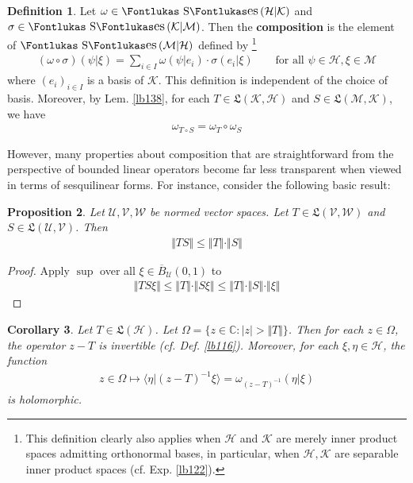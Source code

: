 \documentclass[12pt,b5paper,notitlepage]{article}
\theoremstyle{definition}
\newtheorem{df}{Definition}[subsection]
\theoremstyle{plain}
\newtheorem{pp}[df]{Proposition}
\newtheorem{co}[df]{Corollary}
\DeclareMathOperator{\Ses}{\text{\Fontlukas S}\text{\kern -0pt {\Fontlukas\large es}}\,}
\newcommand{\fk}{\mathfrak}
\newcommand{\ovl}{\overline}
\newcommand{\bk}[1]{\langle {#1}\rangle}
\newcommand{\Cbb}{\mathbb C}
\newcommand{\MU}{\mathcal U}
\newcommand{\MV}{\mathcal V}
\newcommand{\MW}{\mathcal W}
\newcommand{\MH}{\mathcal H}
\newcommand{\MK}{\mathcal K}
\newcommand{\MM}{\mathcal M}
\numberwithin{equation}{section}
\begin{document}
\begin{df}\label{lb144}
Let $\omega\in\Ses(\MH|\MK)$ and $\sigma\in\Ses(\MK|\MM)$. Then the \textbf{composition} \pmb{$\omega\circ\sigma$}  is the element of $\Ses(\MM|\MH)$ defined by \footnote{This definition clearly also applies when $\MH$ and $\MK$ are merely inner product spaces admitting orthonormal bases, in particular, when $\MH,\MK$ are separable inner product spaces (cf. Exp. \ref{lb122}).}
\begin{align*}
(\omega\circ\sigma)(\psi|\xi)=\sum_{i\in I}\omega(\psi|e_i)\cdot\sigma(e_i|\xi)\qquad\text{for all }\psi\in\MH,\xi\in\MM
\end{align*}
where $(e_i)_{i\in I}$ is a basis of $\MK$. This definition is independent of the choice of basis. Moreover, by Lem. \ref{lb138}, for each $T\in\fk L(\MK,\MH)$ and $S\in\fk L(\MM,\MK)$, we have
\begin{align*}
\omega_{T\circ S}=\omega_T\circ\omega_S
\end{align*}
\end{df}





However, many properties about composition that are straightforward from the perspective of bounded linear operators become far less transparent when viewed in terms of sesquilinear forms. For instance, consider the following basic result:

\begin{pp}\label{lb143}
Let $\MU,\MV,\MW$ be normed vector spaces. Let  $T\in\fk L(\MV,\MW)$ and $S\in\fk L(\MU,\MV)$. Then
\begin{align*}
\Vert TS\Vert\leq \Vert T\Vert\cdot\Vert S\Vert
\end{align*}
\end{pp}

\begin{proof}
Apply $\sup$ over all $\xi\in\ovl B_\MU(0,1)$ to
\begin{align*}
\Vert TS\xi\Vert\leq\Vert T\Vert\cdot \Vert S\xi\Vert\leq \Vert T\Vert\cdot\Vert S\Vert\cdot\Vert\xi\Vert
\end{align*}
\end{proof}



\begin{co}\label{lb233}
Let $T\in\fk L(\MH)$. Let $\Omega=\{z\in\Cbb:|z|>\Vert T\Vert\}$. Then for each $z\in\Omega$, the operator $z-T$ is invertible (cf. Def. \ref{lb116}). Moreover, for each $\xi,\eta\in\MH$, the function
\begin{align*}
z\in\Omega\mapsto \bk{\eta|(z-T)^{-1}\xi}=\omega_{(z-T)^{-1}}(\eta|\xi)
\end{align*}
is holomorphic.
\end{co}
\end{document}
